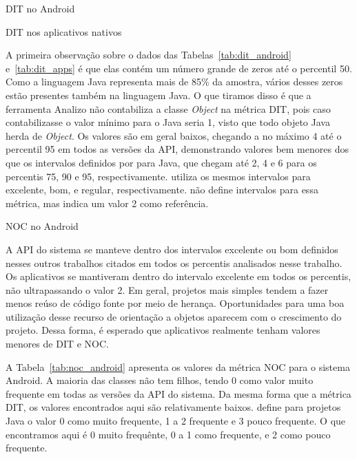 \begin{table}[!htb]
\centering
{}

\caption{DIT no Android}
\label{tab:dit_android}
\end{table}

\begin{table}[!htb]
\centering
{}

\caption{DIT nos aplicativos nativos}
\label{tab:dit_apps}
\end{table}

A primeira observação sobre o dados das Tabelas~\ref{tab:dit_android} e~\ref{tab:dit_apps} é que elas contém um número grande de zeros até o percentil 50. Como a linguagem Java representa mais de 85\% da amostra, vários desses zeros estão presentes também na linguagem Java. O que tiramos disso é que a ferramenta Analizo não contabiliza a classe \textit{Object} na métrica DIT, pois caso contabilizasse o valor mínimo para o Java seria 1, visto que todo objeto Java herda de \textit{Object}. Os valores são em geral baixos, chegando a no máximo 4 até o percentil 95 em todos as versões da API, demonstrando valores bem menores dos que os intervalos definidos por  para Java, que chegam até 2, 4 e 6 para os percentis 75, 90 e 95, respectivamente.  utiliza os mesmos intervalos para excelente, bom, e regular, respectivamente.  não define intervalos para essa métrica, mas indica um valor 2 como referência. 

\begin{table}[!htb]
\centering
{}

\caption{NOC no Android}
\label{tab:noc_android}
\end{table}

A API do sistema se manteve dentro dos intervalos excelente ou bom definidos nesses outros trabalhos citados em todos os percentis analisados nesse trabalho. Os aplicativos se mantiveram dentro do intervalo excelente em todos os percentis, não ultrapassando o valor 2. Em geral, projetos mais simples tendem a fazer menos reúso de código fonte por meio de herança. Oportunidades para uma boa utilização desse recurso de orientação a objetos aparecem com o crescimento do projeto. Dessa forma, é esperado que aplicativos realmente tenham valores menores de DIT e NOC.

A Tabela~\ref{tab:noc_android} apresenta os valores da métrica NOC para o sistema Android. A maioria das classes não tem filhos, tendo 0 como valor muito frequente em todas as versões da API do sistema. Da mesma forma que a métrica DIT, os valores encontrados aqui são relativamente baixos.  define para projetos Java o valor 0 como muito frequente, 1 a 2 frequente e 3 pouco frequente. O que encontramos aqui é 0 muito frequênte, 0 a 1 como frequente, e 2 como pouco frequente.

